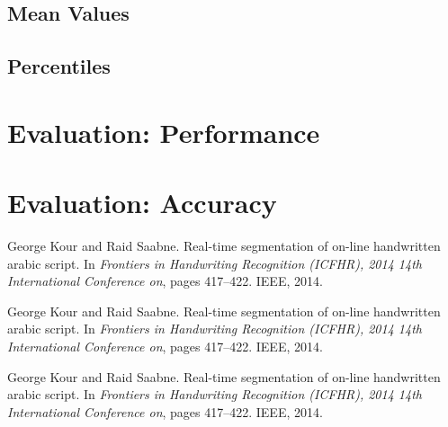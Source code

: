 \documentclass{article}
\theoremstyle{plain}
\theoremstyle{remark}
\begin{document}
\subsection{Mean Values}

\subsection{Percentiles}

\section{Evaluation: Performance}

\section{Evaluation: Accuracy}



\begin{thebibliography}{1}

George Kour and Raid Saabne.
\newblock Real-time segmentation of on-line handwritten arabic script.
\newblock In {\em Frontiers in Handwriting Recognition (ICFHR), 2014 14th
  International Conference on}, pages 417--422. IEEE, 2014.

George Kour and Raid Saabne.
\newblock Real-time segmentation of on-line handwritten arabic script.
\newblock In {\em Frontiers in Handwriting Recognition (ICFHR), 2014 14th
  International Conference on}, pages 417--422. IEEE, 2014.

George Kour and Raid Saabne.
\newblock Real-time segmentation of on-line handwritten arabic script.
\newblock In {\em Frontiers in Handwriting Recognition (ICFHR), 2014 14th
  International Conference on}, pages 417--422. IEEE, 2014.

\end{thebibliography}
\end{document}
